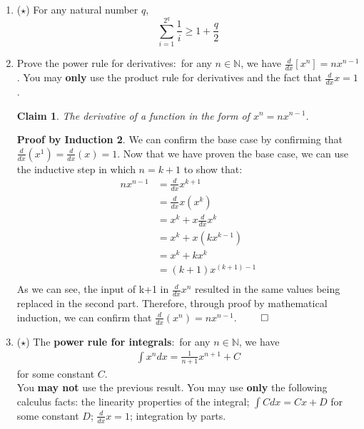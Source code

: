 \documentclass[11pt]{letter}
\newtheorem{claim}{Claim}
\theoremstyle{definition}
\newtheorem{PBI}{Proof by Induction}
\begin{document}
\begin{description}
\begin{enumerate}
\begin{PBI}
\begin{align*}
&2^{n+1}\\
&2(2^{n}) \\
\end{align*}
This confirms that $2^n$ accurately describes the probability of heads and tails. Through Mathemartical Induction, we must conclude that given $n$ coin tosses, there are a total of $2^n$ possibilities. $\qed$
\end{PBI}
			\item ($\star$) For any natural number $q$, $$\sum_{i=1}^{2^q}\frac{1}{i}\geq 1+\frac{q}{2}$$
			\item Prove the power rule for derivatives:~for any $n\in\mathbb{N}$, we have $\frac{d}{dx}[x^n]=nx^{n-1}$. You may {\bfseries only} use the product rule for derivatives and the fact that $\frac{d}{dx}x=1$.
\begin{claim}
	The derivative of a function in the form of $x^n=nx^{n-1}$.
\end{claim}
\begin{PBI}
We can confirm the base case by confirming that $\frac{d}{dx}(x^1)=\frac{d}{dx}(x)=1$. Now that we have proven the base case, we can use the inductive step in which $n=k+1$ to show that: \\
\begin{align*}
nx^{n-1}&=\frac{d}{dx}x^{k+1}\\
&= \frac{d}{dx}x(x^k) \\
&= x^k+x\frac{d}{dx}x^k  \tag{Applied product rule} \\
&= x^k+x(kx^{k-1}) \tag{Substituted with the inductive assumption} \\
&= x^k+kx^k \\
&= (k+1)x^{(k+1)-1} \\
\end{align*}
As we can see, the input of k+1 in $\frac{d}{dx}x^{n}$ resulted in the same values being replaced in the second part. Therefore, through proof by mathematical induction, we can confirm that $\frac{d}{dx}(x^n)=nx^{n-1}$. $\qed$
\end{PBI}
			 \item ($\star$) The {\bfseries power rule for integrals}:~for any $n\in\mathbb{N}$, we have 
				\begin{align*}
					\int x^ndx=\frac{1}{n+1}x^{n+1}+C
				\end{align*}
				for some constant $C$.\\
				You {\bfseries may not} use the previous result. You may use {\bfseries only} the following calculus facts: the linearity properties of the integral; $\int C dx=Cx+D$ for some constant $D$; $\frac{d}{dx} x=1$; integration by parts.

\end{enumerate}
\end{description}
\end{document}
